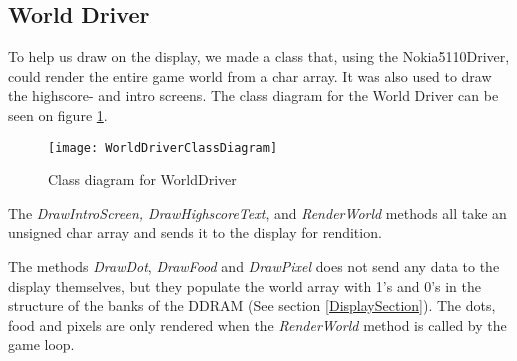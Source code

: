 \subsection{World Driver}
To help us draw on the display, we made a class that, using the Nokia5110Driver, could render the entire game world from a char array. It was also used to draw the highscore- and intro screens. The class diagram for the World Driver can be seen on figure \ref{WorldDriverClassDiagram}.

\begin{figure}[H]
	\texttt{[image: WorldDriverClassDiagram]}
	\centering
	\caption{Class diagram for WorldDriver}
	\label{WorldDriverClassDiagram}
\end{figure}

The \textit{DrawIntroScreen, DrawHighscoreText}, and \textit{RenderWorld} methods all take an unsigned char array and sends it to the display for rendition.

The methods \textit{DrawDot}, \textit{DrawFood} and \textit{DrawPixel} does not send any data to the display themselves, but they populate the world array with 1's and 0's in the structure of the banks of the DDRAM (See section \ref{DisplaySection}). The dots, food and pixels are only rendered when the \textit{RenderWorld} method is called by the game loop.